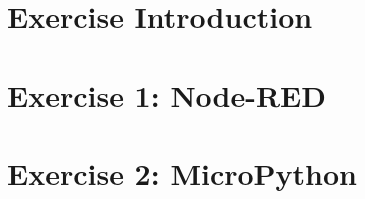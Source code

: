 




\renewcommand{\familydefault}{cmss}






\tableofcontents
\newpage
\listoffigures
\listoftables
\newpage

\printacronyms[heading=chapter*]
\newpage


\chapter{Exercise Introduction}


\chapter{Exercise 1: Node-RED}


\chapter{Exercise 2: MicroPython}


{} 

\renewcommand{\bibname}{References}

\printbibliography


